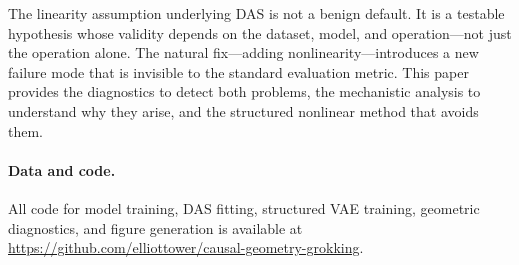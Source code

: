 \documentclass{article}
\begin{document}
The linearity assumption underlying DAS is not a benign default. It is a
testable hypothesis whose validity depends on the dataset, model, and
operation---not just the operation alone. The natural fix---adding
nonlinearity---introduces a new failure mode that is invisible to the
standard evaluation metric. This paper provides the diagnostics to detect
both problems, the mechanistic analysis to understand why they arise, and the
structured nonlinear method that avoids them.

\paragraph{Data and code.} All code for model training, DAS fitting, structured
VAE training, geometric diagnostics, and figure generation is available at
\url{https://github.com/elliottower/causal-geometry-grokking}.

%
%




\clearpage
\appendix

\end{document}

